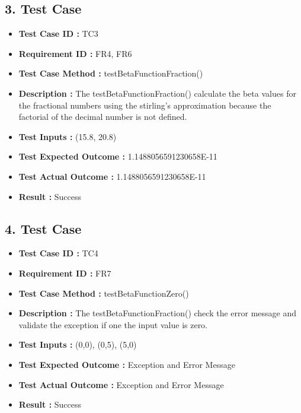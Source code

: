 \documentclass[a4paper, 12pt]{article}
\begin{document}
\subsection*{3. Test Case}
    \begin{itemize}
        \item \textbf{Test Case ID : } TC3
        \item \textbf{Requirement ID : } FR4, FR6
        \item \textbf{Test Case Method : } testBetaFunctionFraction()
        \item \textbf{Description : }The testBetaFunctionFraction() calculate the beta values for the fractional numbers using the stirling's approximation because  the factorial of the decimal number is not defined.
        \item \textbf{Test Inputs : }(15.8, 20.8)
        \item \textbf{Test Expected Outcome : }1.1488056591230658E-11
        \item \textbf{Test Actual Outcome : }1.1488056591230658E-11
        \item \textbf{Result : }Success
    \end{itemize}

\subsection*{4. Test Case}
    \begin{itemize}
        \item \textbf{Test Case ID : } TC4
        \item \textbf{Requirement ID : } FR7
        \item \textbf{Test Case Method : } testBetaFunctionZero()
        \item \textbf{Description : }The testBetaFunctionFraction() check the error message and validate the exception if one the input value is zero.
        \item \textbf{Test Inputs : }(0,0), (0,5), (5,0)
        \item \textbf{Test Expected Outcome : }Exception and Error Message
        \item \textbf{Test Actual Outcome : }Exception and Error Message 
        \item \textbf{Result : }Success
    \end{itemize}
    
\end{document}
